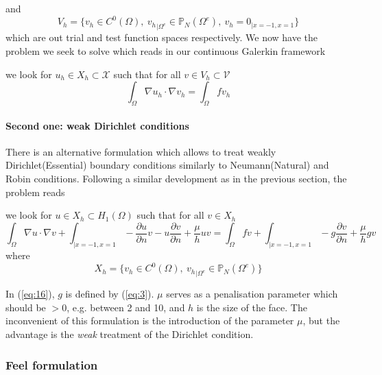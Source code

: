 and
\begin{equation}
  \label{eq:18}
  V_h = \Big\{ v_h \in C^0(\Omega),\ {v_h}_{|\Omega^e} \in \mathbb{P}_N( \Omega^e ),\   v_h=0_{|x=-1,x=1}\Big\}
\end{equation}
which are out trial and test function spaces respectively.  We now
have the problem we seek to solve which reads in our continuous
Galerkin framework
\begin{problem}
  \label{prob:2}
  we look for $u_h \in X_h \subset \mathcal{X}$ such that for all $v
  \in V_h \subset \mathcal{V}$
  \begin{equation}
    \label{eq:20}
    \int_\Omega \nabla u_h \cdot \nabla v_h  = \int_\Omega f v_h
  \end{equation}
\end{problem}

\paragraph{Second one: weak Dirichlet conditions}
\label{sec:weak-dirichl-cond}

There is an alternative formulation which allows to treat weakly
Dirichlet(Essential) boundary conditions similarly to Neumann(Natural)
and Robin conditions. Following a similar development as in the previous section, the problem reads
\begin{problem}
  \label{prob:3}
  we look for $u \in X_h \subset H_1(\Omega)$ such that for all $v \in
  X_h$
\begin{equation}
  \label{eq:16}
  \int_\Omega \nabla u \cdot \nabla v +
  \int_{|x=-1,x=1} -\frac{\partial u}{\partial n} v - u \frac{\partial v}{\partial n} + \frac{\mu}{h} u v
  =
  \int_\Omega f v +
  \int_{|x=-1,x=1}  - g \frac{\partial v}{\partial n} + \frac{\mu}{h} g v
\end{equation}
where
\begin{equation}
  \label{eq:19}
  X_h = \Big\{ v_h \in C^0(\Omega),\ {v_h}_{|\Omega^e} \in \mathbb{P}_N( \Omega^e ) \Big\}
\end{equation}
\end{problem}
In (\ref{eq:16}), $g$ is defined by (\ref{eq:3}). $\mu$ serves as a penalisation
parameter which should be $> 0$, e.g. between 2 and 10, and $h$ is the
size of the face. The inconvenient of this formulation is the
introduction of the parameter $\mu$, but the advantage is the
\emph{weak} treatment of the Dirichlet condition.

\subsubsection{Feel formulation}
\label{sec:feel-formulation-1}


